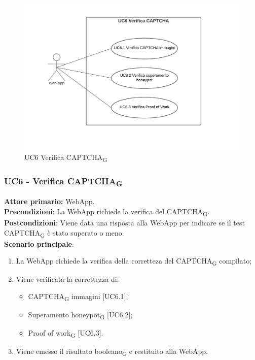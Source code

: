\begin{figure}[H]
    \centering
    \includegraphics[scale=0.6]{img/verifica.png}
    \caption{UC6 Verifica CAPTCHA\textsubscript{G}}
\end{figure}

\subsubsection{UC6 - Verifica CAPTCHA\textsubscript{G}}
\textbf{Attore primario:} WebApp.\\
\textbf{Precondizioni}: La WebApp richiede la verifica 
 del CAPTCHA\textsubscript{G}.\\
\textbf{Postcondizioni}: Viene data una risposta alla WebApp per indicare se il test CAPTCHA\textsubscript{G} è stato superato o meno.\\

\textbf{Scenario principale}:
\begin{enumerate}
    \item La WebApp richiede la verifica della corretteza del CAPTCHA\textsubscript{G} compilato;
    \item Viene verificata la correttezza di:
    \begin{itemize}
		\item CAPTCHA\textsubscript{G} immagini [UC6.1];
        \item Superamento honeypot\textsubscript{G} [UC6.2];
		\item Proof of work\textsubscript{G} [UC6.3].
    \end{itemize}
    \item Viene emesso il risultato booleano\textsubscript{G} e restituito alla WebApp.
\end{enumerate}

